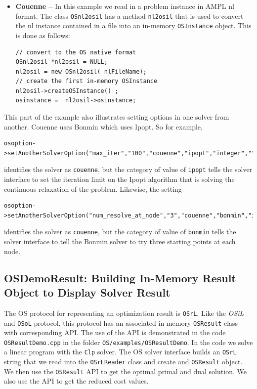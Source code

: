 \documentclass[11pt]{article}
\renewcommand{\_}{{\char"5F}}
\renewcommand{\{}{{\char"7B}}
\renewcommand{\}}{{\char"7D}}
\renewcommand{\^}{{\char"0D}}
\renewcommand{\'}{{\char"0D}}
\begin{document}
\begin{enumerate}[Step 1:]
\begin{itemize}
\item {\bf Couenne --}   In this example we read in a problem instance in AMPL nl format.  
The class {\tt OSnl2osil}  has a method {\tt nl2osil} that is used to convert the nl instance 
contained in a file into an in-memory {\tt OSInstance} object. This is done as follows:

\begin{verbatim}
// convert to the OS native format
OSnl2osil *nl2osil = NULL;
nl2osil = new OSnl2osil( nlFileName);
// create the first in-memory OSInstance
nl2osil->createOSInstance() ;
osinstance =  nl2osil->osinstance;
\end{verbatim}
\end{itemize}

This part of the example also illustrates setting options in one solver from another. 
Couenne uses Bonmin which uses Ipopt.  So for example,

\begin{verbatim}
osoption->setAnotherSolverOption("max_iter","100","couenne","ipopt","integer","");
\end{verbatim}
identifies the solver as {\tt couenne}, but the category of value of {\tt ipopt}  tells the solver 
interface to set the iteration limit on the Ipopt algorithm that is solving the continuous relaxation 
of the problem.  Likewise, the setting
\begin{verbatim}
osoption->setAnotherSolverOption("num_resolve_at_node","3","couenne","bonmin","integer","");
\end{verbatim}
identifies the solver as {\tt couenne}, but the category of value of {\tt bonmin}  tells the solver 
interface to tell the Bonmin solver to try three starting points at each node. 

 

\subsection{OSDemoResult: Building In-Memory Result Object to Display Solver Result}\label{section:exampleOSResultDemo}

The OS protocol for representing an optimization result is {\tt OSrL}. Like the {\it OSiL} and {\tt OSoL} protocol, this protocol has an associated in-memory {\tt OSResult} class with corresponding API.  The use of the API is demonstrated in the code {\tt OSResultDemo.cpp} in the folder {\tt OS/examples/OSResultDemo}.  In the code we solve a linear program with the {\tt Clp} solver.  The OS solver interface builds an {\tt OSrL} string that we read into the {\tt OSrLReader} class and create and {\tt OSResult} object. We then use the {\tt OSResult} API to get the optimal primal and dual solution. We also use the API to get the reduced cost values. 



\end{enumerate}
\end{document}
